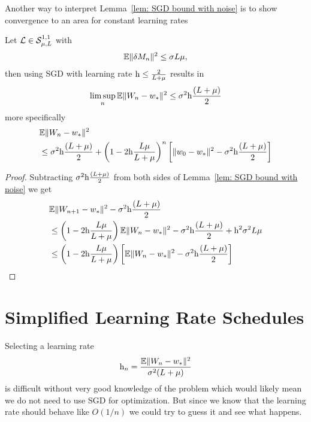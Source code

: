 Another way to interpret Lemma~\ref{lem: SGD bound with noise} is to show
convergence to an area for constant learning rates
\begin{theorem}
	\label{thm: SGD converges to area}
	Let \(\mathcal{L}\in\mathcal{S}^{1,1}_{{\mu},{L}}\) with
	\begin{align*}
		\mathbb{E}\|\delta M_n\|^2 \le \sigma L\mu,
	\end{align*}
	then using SGD with learning rate \(\text{h}\le\frac{2}{L+\mu}\) results in
	\begin{align*}
		\limsup_n\mathbb{E}\|W_n-w_*\|^2
		\le \sigma^2 \text{h}\frac{(L+\mu)}{2}
	\end{align*}
	more specifically
	\begin{align*}
		&\mathbb{E}\|W_n-w_*\|^2\\
		&\le \sigma^2 \text{h}\frac{(L+\mu)}{2}
		+ \left(1-2\text{h}\frac{L\mu}{L+\mu}\right)^n
		\left[
			\|w_0-w_*\|^2-\sigma^2 \text{h}\frac{(L+\mu)}{2}
		\right]
	\end{align*}
\end{theorem}
\begin{proof}
	Subtracting \(\sigma^2 \text{h}\frac{(L+\mu)}{2}\) from both sides
	of Lemma~\ref{lem: SGD bound with noise} we get
	\begin{align*}
		&\mathbb{E}\|W_{n+1}-w_*\|^2 - \sigma^2 \text{h}\frac{(L+\mu)}{2}\\
		&\le \left(1-2\text{h}\frac{L\mu}{L+\mu}\right)
		\mathbb{E}\|W_n-w_*\|^2
		-\sigma^2 \text{h}\frac{(L+\mu)}{2} + \text{h}^2\sigma^2L\mu\\
		&\le \left(1-2\text{h}\frac{L\mu}{L+\mu}\right)
		\left[
			\mathbb{E}\|W_n-w_*\|^2-\sigma^2 \text{h}\frac{(L+\mu)}{2}
		\right]
		\qedhere
	\end{align*}
\end{proof}


\section{Simplified Learning Rate Schedules}\label{sec: simplified learning rate schedules}

Selecting a learning rate
\begin{align*}
	\text{h}_n = \frac{\mathbb{E}\|W_n - w_*\|^2}{\sigma^2(L+\mu)}
\end{align*}
is difficult without very good knowledge of the problem which would likely mean
we do not need to use SGD for optimization. But since we know that the learning
rate should behave like \(O(1/n)\) we could try to guess it and see what happens.

